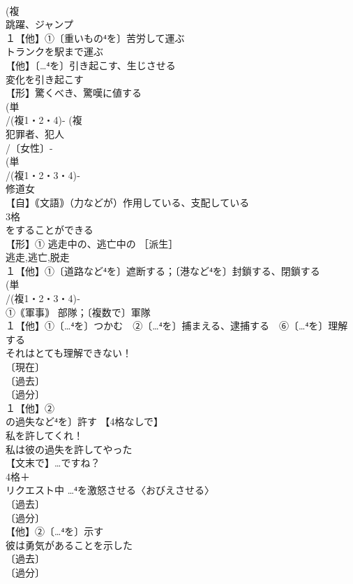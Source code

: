 \documentclass[8pt]{extreport}
\begin{document}
\begin{CJK}{UTF8}{min}
\\	(複
\\	跳躍、ジャンプ 
\\	１【他】①〔重いもの⁴を〕苦労して運ぶ 
\\	トランクを駅まで運ぶ
\\	【他】〔…⁴を〕引き起こす、生じさせる 
\\	変化を引き起こす 
\\	【形】驚くべき、驚嘆に値する 
\\	(単
\\	/(複1・2・4)- (複
\\	犯罪者、犯人 
\\	/〔女性〕-
\\	(単
\\	/(複1・2・3・4)‐
\\	修道女 
\\	【自】｟文語｠（力などが）作用している、支配している
\\	3格 
\\	をすることができる
\\	【形】① 逃走中の、逃亡中の ［派生］ 
\\	逃走,逃亡,脱走
\\	１【他】①〔道路など⁴を〕遮断する；〔港など⁴を〕封鎖する、閉鎖する
\\	(単
\\	/(複1・2・3・4)‐
\\	①｟軍事｠ 部隊；〔複数で〕軍隊 
\\	１【他】①〔…⁴を〕つかむ　②〔…⁴を〕捕まえる、逮捕する　⑥〔…⁴を〕理解する　
\\	それはとても理解できない！
\\	〔現在〕
\\	〔過去〕
\\	〔過分〕
\\	１【他】②
\\	の過失など⁴を〕許す 【4格なしで】
\\	私を許してくれ！ 
\\	私は彼の過失を許してやった 
\\	【文末で】…ですね？
\\	4格＋
\\	リクエスト中	…⁴を激怒させる〈おびえさせる〉
\\	〔過去〕
\\	〔過分〕
\\	【他】②〔…⁴を〕示す 
\\	彼は勇気があることを示した
\\	〔過去〕
\\	〔過分〕

\end{CJK}
\end{document}
